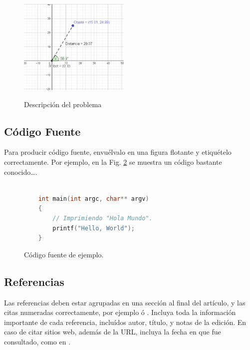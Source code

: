 \documentclass[a4paper,10pt,twocolumn]{article}
\begin{document}
		\begin{figure}[htb]%
		\begin{center}
		\includegraphics[width=200px, height=200px]{images/problem_description.jpg}
		\end{center}
		\caption{Descripción del problema \label{fig:arr}}%
		\end{figure}

	\subsection{Código Fuente}\label{sub:listings}
		Para producir código fuente, envuélvalo en una figura flotante y
		etiquételo correctamente. Por ejemplo, en la Fig. \ref{fig:code}
		se muestra un código bastante conocido\ldots.


		\begin{figure}[htb]%
			\begin{lstlisting}[language=c]%

    int main(int argc, char** argv)
    {
        // Imprimiendo "Hola Mundo".
        printf("Hello, World");
    }

			\end{lstlisting}
		\caption{Código fuente de ejemplo.\label{fig:code}}
		\end{figure}

	\subsection{Referencias}
  	Las referencias deben estar agrupadas en una sección al final del artículo,
  	y las citas numeradas correctamente, por ejemplo \cite{knuth} ó \cite{goedel}.
  	Incluya toda la información importante de cada referencia, incluídos autor,
  	título, y notas de la edición. En caso de citar sitios web, además
  	de la URL, incluya la fecha en que fue consultado, como en \cite{wiki}.
\end{document}
